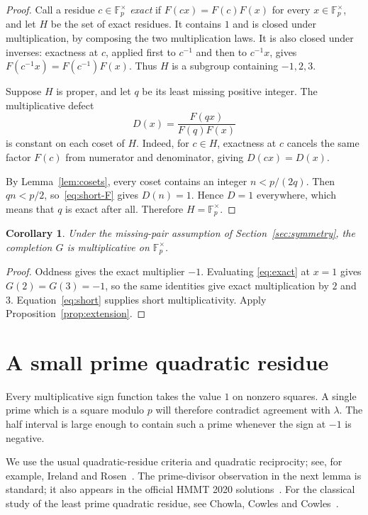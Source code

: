 \documentclass[11pt,a4paper]{article}
\newtheorem{corollary}[theorem]{Corollary}
\theoremstyle{remark}
\numberwithin{equation}{section}
\newcommand{\Fpx}{\mathbb F_p^{\times}}
\newcommand{\lam}{\lambda}
\begin{document}
\begin{proof}
Call a residue \(c\in\Fpx\) \emph{exact} if \(F(cx)=F(c)F(x)\) for every
\(x\in\Fpx\), and let \(H\) be the set of exact residues.
It contains \(1\) and is closed under multiplication, by composing the
two multiplication laws. It is also closed under inverses: exactness at
\(c\), applied first to \(c^{-1}\) and then to \(c^{-1}x\), gives
\(F(c^{-1}x)=F(c^{-1})F(x)\). Thus \(H\) is a subgroup containing
\(-1,2,3\).

Suppose \(H\) is proper, and let \(q\) be its least missing positive
integer. The multiplicative defect
\[
  D(x)=\frac{F(qx)}{F(q)F(x)}
\]
is constant on each coset of \(H\). Indeed, for \(c\in H\), exactness
at \(c\) cancels the same factor \(F(c)\) from numerator and denominator,
giving \(D(cx)=D(x)\).

By Lemma~\ref{lem:cosets}, every coset contains an integer
\(n<p/(2q)\). Then \(qn<p/2\), so~\eqref{eq:short-F} gives
\(D(n)=1\). Hence \(D=1\) everywhere, which means that \(q\) is
exact after all. Therefore \(H=\Fpx\).
\end{proof}

\begin{corollary}\label{cor:multiplicative}
Under the missing-pair assumption of Section~\ref{sec:symmetry}, the
completion \(G\) is multiplicative on \(\Fpx\).
\end{corollary}

\begin{proof}
Oddness gives the exact multiplier \(-1\). Evaluating
\eqref{eq:exact} at \(x=1\) gives \(G(2)=G(3)=-1\), so the same
identities give exact multiplication by \(2\) and \(3\).
Equation~\eqref{eq:short} supplies short multiplicativity. Apply
Proposition~\ref{prop:extension}.
\end{proof}

\section{A small prime quadratic residue}\label{sec:residue}

Every multiplicative sign function takes the value \(1\) on nonzero
squares. A single prime which is a square modulo \(p\) will therefore
contradict agreement with \(\lam\). The half interval is large enough
to contain such a prime whenever the sign at \(-1\) is negative.

We use the usual quadratic-residue criteria and quadratic reciprocity;
see, for example, Ireland and Rosen~\cite[Chapter~5]{IrelandRosen}.
The prime-divisor observation in the next lemma is standard; it also
appears in the official HMMT 2020 solutions~\cite[Problem~9]{HMMT}.
For the classical study of the least prime quadratic residue, see
Chowla, Cowles and Cowles~\cite{ChowlaCowlesCowles}.
\end{document}
